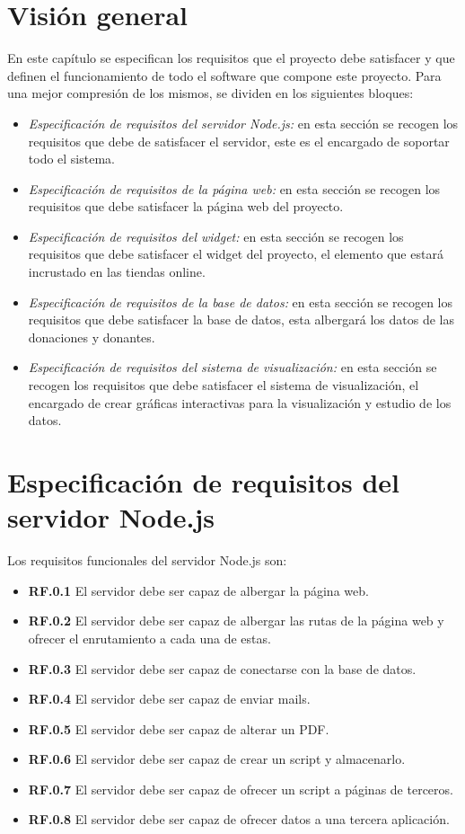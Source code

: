 \section{Visión general}

En este capítulo se especifican los requisitos que el proyecto debe satisfacer y que definen el funcionamiento de todo el software que compone este proyecto. Para una mejor compresión de los mismos, se dividen en los siguientes bloques:

\begin{itemize}
	\item \textit{Especificación de requisitos del servidor Node.js:} en esta sección se recogen los requisitos que debe de satisfacer el servidor, este es el encargado de soportar todo el sistema.
	\item \textit{Especificación de requisitos de la página web:} en esta sección se recogen los requisitos que debe satisfacer la página web del proyecto.
	\item \textit{Especificación de requisitos del widget:} en esta sección se recogen los requisitos que debe satisfacer el widget del proyecto, el elemento que estará incrustado en las tiendas online.
	\item \textit{Especificación de requisitos de la base de datos:} en esta sección se recogen los requisitos que debe satisfacer la base de datos, esta albergará los datos de las donaciones y donantes.
	\item \textit{Especificación de requisitos del sistema de visualización:} en esta sección se recogen los requisitos que debe satisfacer el sistema de visualización, el encargado de crear gráficas interactivas para la visualización y estudio de los datos.
\end{itemize}

\section{Especificación de requisitos del servidor Node.js}
Los requisitos funcionales del servidor Node.js son:

\begin{itemize}
	\item \textbf{RF.0.1} El servidor debe ser capaz de albergar la página web.
	\item \textbf{RF.0.2} El servidor debe ser capaz de albergar las rutas de la página web y ofrecer el enrutamiento a cada una de estas.
	\item \textbf{RF.0.3} El servidor debe ser capaz de conectarse con la base de datos.
	\item \textbf{RF.0.4} El servidor debe ser capaz de enviar mails.
	\item \textbf{RF.0.5} El servidor debe ser capaz de alterar un PDF.
	\item \textbf{RF.0.6} El servidor debe ser capaz de crear un script y almacenarlo.
	\item \textbf{RF.0.7} El servidor debe ser capaz de ofrecer un script a páginas de terceros.
	\item \textbf{RF.0.8} El servidor debe ser capaz de ofrecer datos a una tercera aplicación.
\end{itemize}

